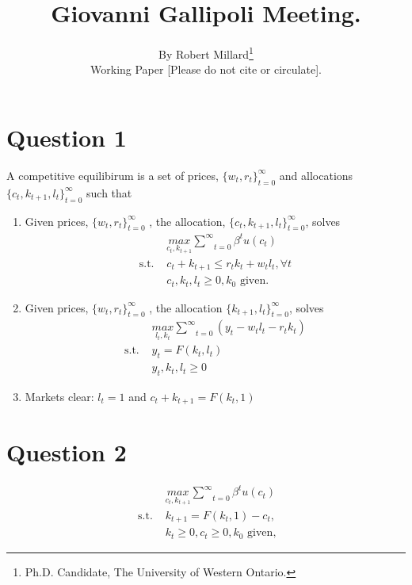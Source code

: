 \documentclass{article}
\title{Giovanni Gallipoli Meeting.}
\author{By Robert Millard\footnote{Ph.D. Candidate, The University of Western Ontario.}\\
Working Paper [Please do not cite or circulate]. }
\begin{document}
\section*{Question 1}
A competitive equilibirum is a set of prices, $\{w_{t}, r_{t}\}_{t=0}^{\infty}$ and allocations $\{c_{t}, k_{t+1}, l_{t} \}_{t=0}^{\infty}$ such that 
\begin{enumerate}
\item Given prices, $\{w_{t}, r_{t}\}_{t=0}^{\infty}$ , the allocation, $\{c_{t}, k_{t+1}, l_{t} \}_{t=0}^{\infty}$, solves
\begin{align}
&\underset{c_{t}, k_{t+1}}{max} \underset{t=0}{\overset{\infty}{\sum}} \beta^{t} u (c_{t})\\
\text{s.t. }& c_{t} + k_{t+1} \leq r_{t}k_{t} + w_{t}l_{t}, \forall t\\
& c_{t}, k_{t}, l_{t} \geq 0, k_{0} \text{ given}.
\end{align}

\item Given prices, $\{ w_{t}, r_{t}\}_{t=0}^{\infty}$ , the allocation $\{k_{t+1}, l_{t} \}_{t=0}^{\infty}$, solves 
\begin{align}
&\underset{l_{t}, k_{t}}{max}\underset{t=0}{\overset{\infty}{\sum}} (y_{t} - w_{t}l_{t} - r_{t}k_{t})\\
\text{s.t. }& y_{t} =  F(k_{t},l_{t}) \\
&y_{t}, k_{t}, l_{t} \geq 0
\end{align}
\item Markets clear: $l_{t} = 1$ and $c_{t} + k_{t+1} = F(k_{t}, 1)$
\end{enumerate}


\section*{Question 2}
\begin{align}
&\underset{c_{t}, k_{t+1}}{max} \underset{t=0}{\overset{\infty}{\sum}} \beta^{t} u (c_{t}) \\
\text{ s.t. } &k_{t+1} = F(k_{t},1) - c_{t},\\
 &k_{t} \geq 0, c_{t} \geq 0,  k_{0} \text{ given},  
\end{align}

\end{document}
